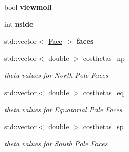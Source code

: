 \begin{DoxyCompactItemize}
\item 
\hypertarget{classRigging_a983138c5234c78baf367263fbe6e5c6d}{
bool {\bfseries viewmoll}}
\label{classRigging_a983138c5234c78baf367263fbe6e5c6d}

\item 
\hypertarget{classRigging_a922366ad0a5e03f1452362a4c9fa2336}{
int {\bfseries nside}}
\label{classRigging_a922366ad0a5e03f1452362a4c9fa2336}

\item 
\hypertarget{classRigging_a9736dd6f4182015d5c3496088c5bd8df}{
std::vector$<$ \hyperlink{classFace}{Face} $>$ {\bfseries faces}}
\label{classRigging_a9736dd6f4182015d5c3496088c5bd8df}

\item 
\hypertarget{classRigging_a5eed9c32ef43d3364e95791c2ca70f37}{
std::vector$<$ double $>$ \hyperlink{classRigging_a5eed9c32ef43d3364e95791c2ca70f37}{costhetas\_\-np}}
\label{classRigging_a5eed9c32ef43d3364e95791c2ca70f37}

\begin{DoxyCompactList}\small\item\em theta values for North Pole Faces \item\end{DoxyCompactList}\item 
\hypertarget{classRigging_a5d3aaccdb4e5e1918a7cef7342f0c9bf}{
std::vector$<$ double $>$ \hyperlink{classRigging_a5d3aaccdb4e5e1918a7cef7342f0c9bf}{costhetas\_\-eq}}
\label{classRigging_a5d3aaccdb4e5e1918a7cef7342f0c9bf}

\begin{DoxyCompactList}\small\item\em theta values for Equatorial Pole Faces \item\end{DoxyCompactList}\item 
\hypertarget{classRigging_aa02a250484cfee4d2d0400ed61b8f9cf}{
std::vector$<$ double $>$ \hyperlink{classRigging_aa02a250484cfee4d2d0400ed61b8f9cf}{costhetas\_\-sp}}
\label{classRigging_aa02a250484cfee4d2d0400ed61b8f9cf}

\begin{DoxyCompactList}\small\item\em theta values for South Pole Faces \item\end{DoxyCompactList}\end{DoxyCompactItemize}


